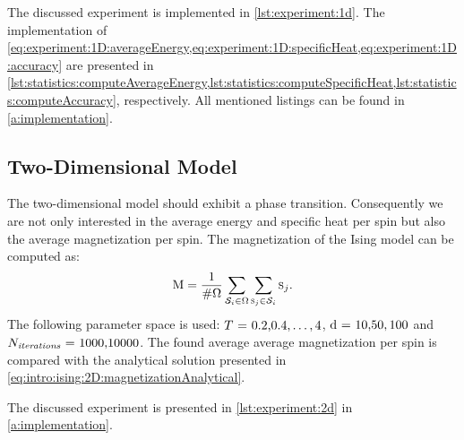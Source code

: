 	The discussed experiment is implemented in \cref{lst:experiment:1d}. 
	The implementation of \cref{eq:experiment:1D:averageEnergy,eq:experiment:1D:specificHeat,eq:experiment:1D:accuracy}
	are presented in \cref{lst:statistics:computeAverageEnergy,lst:statistics:computeSpecificHeat,lst:statistics:computeAccuracy}, respectively. 
	All mentioned listings can be found in \cref{a:implementation}.	
	

\subsection{Two-Dimensional Model}
\label{ss:experiment:2D}
	The two-dimensional model should exhibit a phase transition. Consequently we are not only interested in the average energy and specific heat per spin but also the average magnetization per spin. The magnetization of the Ising model can be computed as:
	\begin{equation}\label{eq:experiment:2D:magnetization}
		\mathrm{M} = \frac{1}{\#\Omega} \sum_{\mathcal{S}_{i} \in \Omega} \sum_{\textsc{s}_{j} \in \mathcal{S}_{i}} \textsc{s}_{j}.
	\end{equation}
	The following parameter space is used: $\mbox{\temperature = 0.2,} 0.4, \dotsc, 4$, $\mbox{\dimensionality = 10,} 50, 100$ and $\mbox{\numberOfIterations = 1000,} 10000$. The found average average magnetization per spin is compared with the analytical solution presented in \cref{eq:intro:ising:2D:magnetizationAnalytical}.

	The discussed experiment is presented in \cref{lst:experiment:2d} in \cref{a:implementation}.